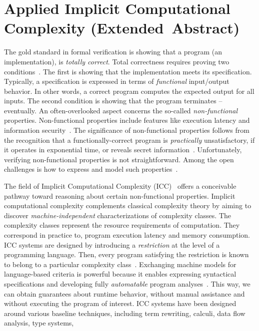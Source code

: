 
\section*{Applied Implicit Computational Complexity \mbox{(Extended Abstract)}}

The gold standard in formal verification is showing that a program (\ie an implementation), is \emph{totally correct}.
Total correctness requires proving two conditions~\cite{leino2023}.
The first is showing that the implementation meets its specification.
Typically, a specification is expressed in terms of \emph{functional} input/output behavior.
In other words, a correct program computes the expected output for all inputs.
The second condition is showing that the program terminates -- {eventually}.
An often-overlooked aspect concerns the so-called \emph{non-functional} properties.
Non-functional properties include features like execution latency and information security~\cite{terbeek2018}.
The significance of non-functional properties follows from the recognition that a functionally-correct program is \emph{practically} unsatisfactory, if it operates in exponential time, or reveals secret information~\cite{heraud2011,aubert20222}.
Unfortunately, verifying non-functional properties is not straightforward.
Among the open challenges is how to express and model such properties~\cite{etaps2025}.

The field of {Implicit Computational Complexity (ICC)}~\cite{dallago2011} offers a conceivable pathway toward reasoning about certain non-functional properties.
Implicit computational complexity complements classical complexity theory by aiming to discover \emph{machine-independent} characterizations of complexity classes.
The complexity classes represent the resource requirements of computation.
They correspond in practice to, \eg program execution latency and memory consumption.
ICC systems are designed by introducing a \emph{restriction} at the level of a programming language.
Then, every program satisfying the restriction is known to belong to a particular complexity class~\cite{pchoux2020}.
Exchanging machine models for language-based criteria is powerful because it enables expressing syntactical specifications and developing fully \emph{automatable} program analyses~\cite{heraud2011}.
This way, we can obtain {guarantees} about runtime behavior, without manual assistance and without executing the program of interest.
ICC systems have been designed around various baseline techniques, including term rewriting, calculi, data flow analysis, type systems, \etc~\cite{baillot2012,moyen2017}

